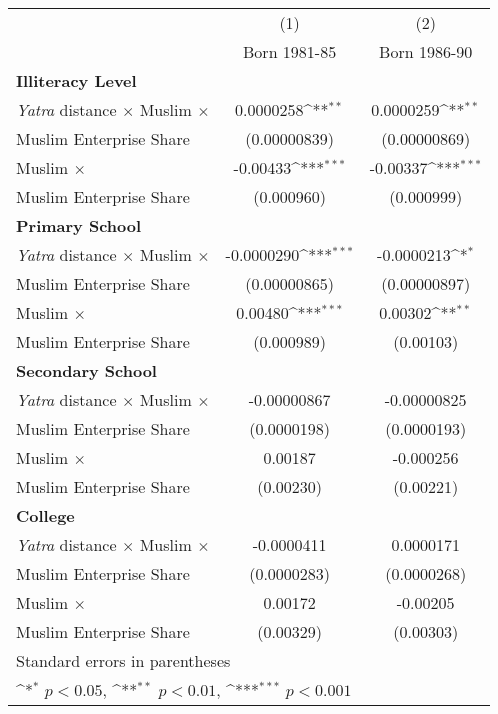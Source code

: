 {
\def\sym#1{\ifmmode^{#1}\else\(^{#1}\)\fi}
\begin{tabular}{l*{2}{c}}
\hline\hline
            &\multicolumn{1}{c}{(1)}&\multicolumn{1}{c}{(2)}\\
            &\multicolumn{1}{c}{Born 1981-85}&\multicolumn{1}{c}{Born 1986-90}\\
[1em]            
\hline
\textbf{Illiteracy Level} & & \\
[1em]
\textit{Yatra} distance $\times$ Muslim $\times$ &   0.0000258\sym{**} &   0.0000259\sym{**} \\
Muslim Enterprise Share            &(0.00000839)         &(0.00000869)         \\
[2em]

Muslim $\times$ &    -0.00433\sym{***}&    -0.00337\sym{***} \\
Muslim Enterprise Share &  (0.000960)         &  (0.000999)         \\
[1em]
\hline
\textbf{Primary School} & & \\
[1em]
\textit{Yatra} distance $\times$ Muslim $\times$ &  -0.0000290\sym{***}&  -0.0000213\sym{*}  \\
Muslim Enterprise Share &(0.00000865)         &(0.00000897)         \\
[2em]
Muslim $\times$ &     0.00480\sym{***}&     0.00302\sym{**} \\
Muslim Enterprise Share &  (0.000989)         &   (0.00103)         \\
[1em]
\hline
\textbf{Secondary School} & & \\
[1em]
\textit{Yatra} distance $\times$ Muslim $\times$ & -0.00000867         & -0.00000825         \\
Muslim Enterprise Share & (0.0000198)         & (0.0000193)         \\
[2em]
Muslim $\times$ &     0.00187         &   -0.000256         \\
Muslim Enterprise Share &   (0.00230)         &   (0.00221)         \\
[1em]
\hline
\textbf{College} & & \\
[1em]
\textit{Yatra} distance $\times$ Muslim $\times$&  -0.0000411         &   0.0000171         \\
Muslim Enterprise Share & (0.0000283)         & (0.0000268)         \\
[2em]
Muslim $\times$ &     0.00172         &    -0.00205         \\
Muslim Enterprise Share &   (0.00329)         &   (0.00303)         \\
[1em]
\hline\hline
\multicolumn{3}{l}{\footnotesize Standard errors in parentheses}\\
\multicolumn{3}{l}{\footnotesize \sym{*} \(p<0.05\), \sym{**} \(p<0.01\), \sym{***} \(p<0.001\)}\\
\end{tabular}
}